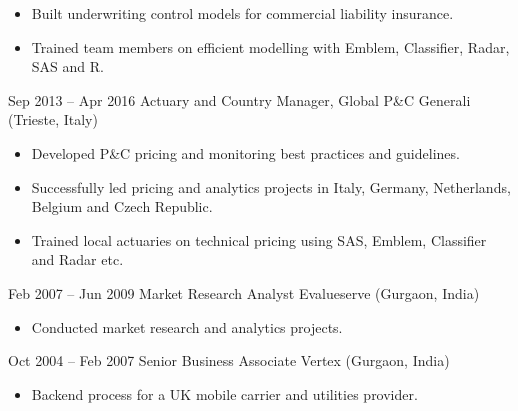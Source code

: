 \documentclass[
	a4paper,
]{fortysecondscv}
\begin{document}
\begin{cvtable}[2.5]
{\begin{itemize}[nosep, leftmargin=0pt]
					\item Built underwriting control models for commercial liability insurance.
					\item Trained team members on efficient modelling with Emblem, Classifier, Radar, SAS and R.
				\end{itemize}
			}
		\cvitem
			{Sep 2013 -- Apr 2016}
			{Actuary and Country Manager, Global P\&C}
			{Generali (Trieste, Italy)}
			{
				\vspace{-\topsep}
				\begin{itemize}[nosep, leftmargin=0pt] %
					\item Developed P\&C pricing and monitoring best practices and guidelines.
					\item Successfully led pricing and analytics projects in Italy, Germany, Netherlands, Belgium and Czech Republic.
					\item Trained local actuaries on technical pricing using SAS, Emblem, Classifier and Radar etc.
				\end{itemize}
			}
		\cvitem
			{Feb 2007 -- Jun 2009}
			{Market Research Analyst}
			{Evalueserve (Gurgaon, India)}
			{
				\vspace{-\topsep}
				\begin{itemize}[nosep, leftmargin=0pt] %
					\item Conducted market research and analytics projects.
				\end{itemize}
			}
		\cvitem
			{Oct 2004 -- Feb 2007}
			{Senior Business Associate}
			{Vertex (Gurgaon, India)}
			{ 
				\vspace{-\topsep}
				\begin{itemize}[nosep, leftmargin=0pt] %
					\item Backend process for a UK mobile carrier and utilities provider.
				\end{itemize}
			}
	\end{cvtable}

\end{document}
